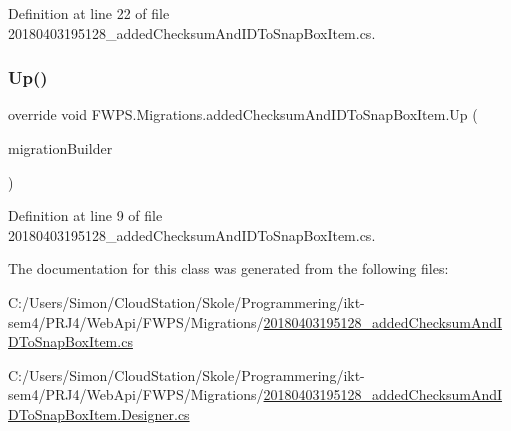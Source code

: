 Definition at line 22 of file 20180403195128\+\_\+added\+Checksum\+And\+I\+D\+To\+Snap\+Box\+Item.\+cs.

\mbox{\label{class_f_w_p_s_1_1_migrations_1_1added_checksum_and_i_d_to_snap_box_item_a4f36fdeede63b08618eccad7ba4fa019}} 
\subsubsection{\texorpdfstring{Up()}{Up()}}
{\footnotesize\ttfamily override void F\+W\+P\+S.\+Migrations.\+added\+Checksum\+And\+I\+D\+To\+Snap\+Box\+Item.\+Up (\begin{DoxyParamCaption}\item[{Migration\+Builder}]{migration\+Builder }\end{DoxyParamCaption})\hspace{0.3cm}{\ttfamily [protected]}}



Definition at line 9 of file 20180403195128\+\_\+added\+Checksum\+And\+I\+D\+To\+Snap\+Box\+Item.\+cs.



The documentation for this class was generated from the following files\+:\begin{DoxyCompactItemize}
\item 
C\+:/\+Users/\+Simon/\+Cloud\+Station/\+Skole/\+Programmering/ikt-\/sem4/\+P\+R\+J4/\+Web\+Api/\+F\+W\+P\+S/\+Migrations/\mbox{\hyperlink{20180403195128__added_checksum_and_i_d_to_snap_box_item_8cs}{20180403195128\+\_\+added\+Checksum\+And\+I\+D\+To\+Snap\+Box\+Item.\+cs}}\item 
C\+:/\+Users/\+Simon/\+Cloud\+Station/\+Skole/\+Programmering/ikt-\/sem4/\+P\+R\+J4/\+Web\+Api/\+F\+W\+P\+S/\+Migrations/\mbox{\hyperlink{20180403195128__added_checksum_and_i_d_to_snap_box_item_8_designer_8cs}{20180403195128\+\_\+added\+Checksum\+And\+I\+D\+To\+Snap\+Box\+Item.\+Designer.\+cs}}\end{DoxyCompactItemize}
